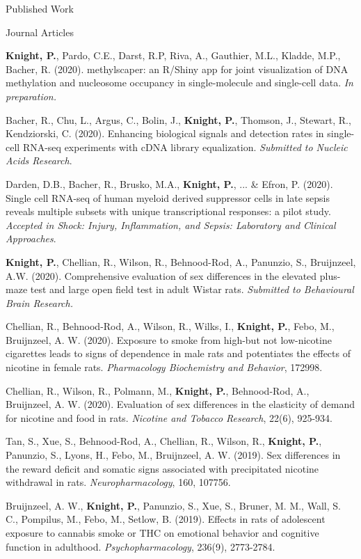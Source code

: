 \documentclass{resume}
\begin{document}
\begin{rSection}{Published Work} %
  \begin{rSubsection}{Journal Articles}{}{}{}
    \item \textbf{Knight, P.}, Pardo, C.E., Darst, R.P, Riva, A.,
      Gauthier, M.L., Kladde, M.P., Bacher, R. (2020). methylscaper:
      an R/Shiny app for joint visualization of DNA methylation and
      nucleosome occupancy in single-molecule and single-cell
      data. \textit{In preparation.}
    \item Bacher, R., Chu, L., Argus, C., Bolin, J., \textbf{Knight,
        P.}, Thomson, J., Stewart, R., Kendziorski,
      C. (2020). Enhancing biological signals and detection rates in
      single-cell RNA-seq experiments with cDNA library
      equalization. \textit{Submitted to Nucleic Acids Research}.
    \item Darden, D.B., Bacher, R., Brusko, M.A., \textbf{Knight, P.},
      ... \& Efron, P. (2020). Single cell RNA-seq of human myeloid derived suppressor
      cells in late sepsis reveals multiple subsets with unique
      transcriptional responses: a pilot study. \textit{Accepted in
        Shock: Injury, Inflammation, and Sepsis: Laboratory and
        Clinical Approaches}. 
    \item \textbf{Knight, P.}, Chellian, R., Wilson, R., Behnood-Rod,
      A., Panunzio, S., Bruijnzeel, A.W. (2020). Comprehensive evaluation of sex differences in the elevated
      plus-maze test and large open field test in adult Wistar
      rats. \textit{Submitted to Behavioural Brain Research.}
    \item Chellian, R., Behnood-Rod, A., Wilson, R., Wilks, I.,
      \textbf{Knight, P.}, Febo, M., Bruijnzeel, A. W. (2020). Exposure to
      smoke from high-but not low-nicotine cigarettes leads to signs
      of dependence in male rats and potentiates the effects of
      nicotine in female rats. \textit{Pharmacology Biochemistry and Behavior},
      172998.
    \item Chellian, R., Wilson, R., Polmann, M., \textbf{Knight, P.},
      Behnood-Rod, A., Bruijnzeel, A. W. (2020). Evaluation of sex
      differences in the elasticity of demand for nicotine and food in
      rats. \textit{Nicotine and Tobacco Research}, 22(6), 925-934.
    \item Tan, S., Xue, S., Behnood-Rod, A., Chellian, R., Wilson, R.,
      \textbf{Knight, P.}, Panunzio, S., Lyons, H., Febo, M., Bruijnzeel, A. W. (2019). Sex differences in
      the reward deficit and somatic signs associated with
      precipitated nicotine withdrawal in rats. \textit{Neuropharmacology},
      160, 107756.
    \item Bruijnzeel, A. W., \textbf{Knight, P.}, Panunzio, S., Xue, S.,
      Bruner, M. M., Wall, S. C., Pompilus, M., Febo, M., Setlow, B. (2019). Effects in
      rats of adolescent exposure to cannabis smoke or THC on
      emotional behavior and cognitive function in
      adulthood. \textit{Psychopharmacology}, 236(9), 2773-2784.
    \end{rSubsection}
    \end{rSection}
\end{document}
